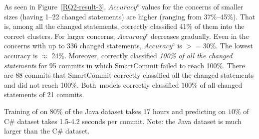 
	

\vspace{2pt}
 As seen in
Figure~\ref{RQ2-result-3}, $Accuracy^{c}$ values for the concerns of
smaller sizes (having 1--22 changed statements) are higher (ranging
from 37\%--45\%). That is, among all the changed statements, {\tool}
correctly classified 41\% of them into the correct clusters. 
For larger concerns, $Accuracy^{c}$ decreases gradually. Even in
the concerns with up to 336 changed statements, $Accuracy^{c}$ is
$>=$30\%. The lowest accuracy is $\approx$ 24\%. Moreover,
{\tool} correctly classified {\em 100\% of all the changed statements}
for 95 commits in which SmartCommit failed to reach 100\%. There are 88
commits that SmartCommit correctly classified all the changed statements
and {\tool} did not reach 100\%. Both~models correctly classified
100\% of all changed statements of 21 commits.


Training of \tool on $80\%$ of the Java dataset takes 17 hours and
predicting on $10\%$ of C\# dataset takes 1.5-4.2 seconds per commit.
Note: the Java dataset is much larger than the C\# dataset.
